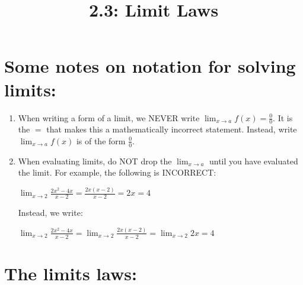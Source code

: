 \documentclass[nooutcomes, handout]{ximera}
\title{2.3:  Limit Laws}
\begin{document}
\begin{abstract}		\end{abstract}
\maketitle

\section{Some notes on notation for solving limits:}
\begin{enumerate}
	\item When writing a form of a limit, we NEVER write $\lim_{x \to a}f(x)=\frac{0}{0}$.  It is the $=$ that makes this a mathematically incorrect statement.  Instead, write $\lim_{x \to a}f(x)$ is of the form $\frac{0}{0}$.

	\item When evaluating limits, do NOT drop the $\lim_{x \to a}$ until you have evaluated the limit.  For example, the following is INCORRECT:
	\begin{center}
	$\lim_{x \to 2}\frac{2x^2-4x}{x-2}=\frac{2x(x-2)}{x-2}=2x=4$\\	
	\end{center}

	Instead, we write: 
		\begin{center}
	$\lim_{x \to 2}\frac{2x^2-4x}{x-2}=\lim_{x \to 2}\frac{2x(x-2)}{x-2}=\lim_{x \to 2}2x=4$\\	
	\end{center}

\end{enumerate}

 \section{The limits laws:}
  
\end{document}

